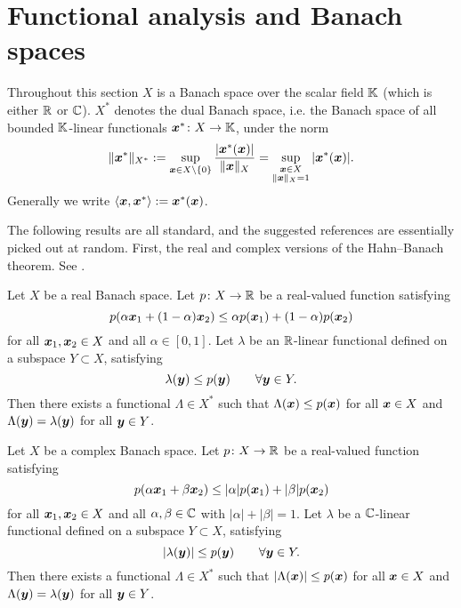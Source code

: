 \section{Functional analysis and Banach spaces}

Throughout this section $X$ is a Banach space over the scalar field $\mathbb{K}$ (which is either $\mathbb{R}$ or $\mathbb{C}$).
$X^*$ denotes the dual Banach space, i.e. the Banach space of all bounded $\mathbb{K}$-linear functionals $\bm{x}^* \colon X \rightarrow \mathbb{K}$, under the norm
\begin{equation*}
  \|\bm{x}^*\|_{X^*} := \sup_{\bm{x} \in X \setminus \{0\}} \frac{|\bm{x}^*(\bm{x})|}{\|\bm{x}\|_{X}} = \sup_{\substack{\bm{x} \in X \\ \|\bm{x}\|_{X} = 1}} |\bm{x}^*(\bm{x})|.
\end{equation*}
Generally we write $\langle \bm{x}, \bm{x}^* \rangle := \bm{x}^*(\bm{x})$.

The following results are all standard, and the suggested references are essentially picked out at random.
First, the real and complex versions of the Hahn--Banach theorem.
See \cite[Section III.3]{RS80}.

\begin{thm}
  Let $X$ be a real Banach space.
  Let $p \colon X \rightarrow \mathbb{R}$ be a real-valued function satisfying
  \begin{equation*}
    p(\alpha \bm{x}_1 + (1-\alpha) \bm{x}_2) \leq \alpha p(\bm{x}_1) + (1-\alpha)p(\bm{x}_2)
  \end{equation*}
  for all $\bm{x}_1, \bm{x}_2 \in X$ and all $\alpha \in  [0,1]$.
  Let $\lambda$ be an $\mathbb{R}$-linear functional defined on a subspace $Y \subset X$, satisfying
  \begin{equation*}
    \lambda(\bm{y}) \leq p(\bm{y}) \qquad \forall \bm{y} \in Y.
  \end{equation*}
  Then there exists a functional $\Lambda \in X^*$ such that $\Lambda(\bm{x}) \leq p(\bm{x})$ for all $\bm{x} \in X$ and $\Lambda(\bm{y}) = \lambda(\bm{y})$ for all $\bm{y} \in Y$.
\end{thm}

\begin{thm}
  Let $X$ be a complex Banach space.
  Let $p \colon X \rightarrow \mathbb{R}$ be a real-valued function satisfying
  \begin{equation*}
    p(\alpha \bm{x}_1 + \beta \bm{x}_2) \leq |\alpha|p(\bm{x}_1) + |\beta|p(\bm{x}_2)
  \end{equation*}
  for all $\bm{x}_1, \bm{x}_2 \in X$ and all $\alpha,\beta \in \mathbb{C}$ with $|\alpha| + |\beta| = 1$.
  Let $\lambda$ be a $\mathbb{C}$-linear functional defined on a subspace $Y \subset X$, satisfying
  \begin{equation*}
    |\lambda(\bm{y})| \leq p(\bm{y}) \qquad \forall \bm{y} \in Y.
  \end{equation*}
  Then there exists a functional $\Lambda \in X^*$ such that $|\Lambda(\bm{x})| \leq p(\bm{x})$ for all $\bm{x} \in X$ and $\Lambda(\bm{y}) = \lambda(\bm{y})$ for all $\bm{y} \in Y$.
\end{thm}

